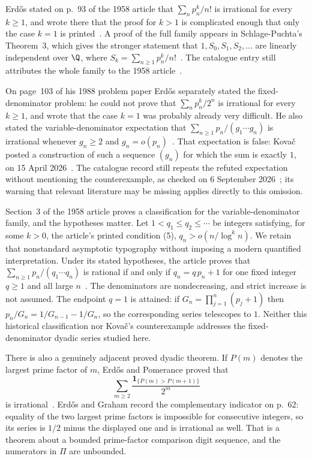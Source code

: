 \documentclass[11pt]{article}
\begin{document}
Erd\H{o}s stated on p.~93 of the 1958 article that $\sum_n p_n^{k}/n!$ is
irrational for every $k\ge1$, and wrote there that the proof for $k>1$ is
complicated enough that only the case $k=1$ is
printed~\cite[pp.~93--95]{erdos1958}.  A proof of the full family appears in
Schlage-Puchta's Theorem~3, which gives the stronger statement that
$1,S_0,S_1,S_2,\ldots$ are linearly independent over $\Q$, where
$S_k=\sum_{n\ge1}p_n^{k}/n!$~\cite[Theorem~3]{schlagepuchta2011}.  The
catalogue entry still attributes the whole family to the 1958
article~\cite{erdosproblems}.

On page~103 of his 1988 problem paper Erd\H{o}s separately stated the
fixed-denominator problem: he could not prove that $\sum_n p_n^{k}/2^{n}$ is
irrational for every $k\ge1$, and wrote that the case $k=1$ was probably
already very difficult.  He also stated the variable-denominator expectation
that $\sum_{n\ge1}p_n/(g_1\cdots g_n)$ is irrational whenever $g_n\ge2$ and
$g_n=o(p_n)$~\cite[p.~103]{erdos1988}.  That expectation is false: Kova\v{c}
posted a construction of such a sequence $(g_n)$ for which the sum is exactly
$1$, on 15 April 2026~\cite[Theorem~1 and proof, pp.~1--2]{kovac2026}.  The
catalogue record still repeats the refuted expectation without mentioning the
counterexample, as checked on 6 September 2026~\cite{erdosproblems}; its
warning that relevant literature may be missing applies directly to this
omission.

Section~3 of the 1958 article proves a classification for the
variable-denominator family, and the hypotheses matter.  Let
$1<q_1\le q_2\le\cdots$ be integers satisfying, for some $k>0$, the article's
printed condition (5), $q_n>o(n/\log^{k}n)$. We retain that nonstandard
asymptotic typography without imposing a modern quantified interpretation.
Under its stated hypotheses, the article proves that
$\sum_{n\ge1}p_n/(q_1\cdots q_n)$
is rational if and only if $q_n=q\,p_n+1$ for one fixed integer $q\ge1$ and all
large $n$~\cite[pp.~96--97]{erdos1958}.  The denominators are nondecreasing,
and strict increase is not assumed. The endpoint $q=1$ is attained: if
$G_n=\prod_{j=1}^{n}(p_j+1)$ then $p_n/G_n=1/G_{n-1}-1/G_n$, so the
corresponding series telescopes to $1$. Neither this historical classification
nor Kova\v{c}'s counterexample addresses the fixed-denominator dyadic
series studied here.

There is also a genuinely adjacent proved dyadic theorem.  If $P(m)$ denotes
the largest prime factor of $m$, Erd\H{o}s and Pomerance proved that
\[
 \sum_{m\ge2}\frac{\mathbf 1_{\{P(m)>P(m+1)\}}}{2^m}
\]
is irrational~\cite[\S7, p.~320]{erdospomerance1978}.  Erd\H{o}s and Graham
record the complementary indicator on p.~62: equality of the two largest prime
factors is impossible for consecutive integers, so its series is $1/2$ minus
the displayed one and is irrational as well.  That is a theorem about a bounded
prime-factor comparison digit sequence, and the numerators in $\Pi$ are
unbounded.
\end{document}

